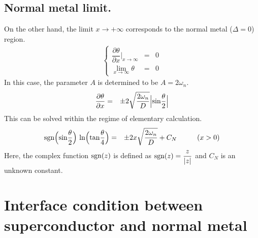 \documentclass[uplatex,a4j,12pt,dvipdfmx]{jsarticle}
\begin{document}
\subsection{Normal metal limit.}

On the other hand,
the limit $x \to + \infty$ corresponds to
the normal metal ($\Delta=0$) region.
\begin{eqnarray}
	\left\{
	\begin{array}{rcl}
		\dfrac{\partial \theta}{\partial x} \Big|_{x \to \infty}
		 & = & 0
		\\[4mm]
		\displaystyle \lim_{x \to \infty} \theta
		 & = &
		0
	\end{array}
	\right.
\end{eqnarray}
In this case, the parameter $A$ is determined to be $A=2 \omega_{n}$.
\begin{eqnarray}
	\dfrac{\partial \theta}{\partial x}
	&=&
	\pm
	2 \sqrt{ \dfrac{2 \omega_{n}}{D} } \Big| {\rm sin} \dfrac{\theta}{2} \Big|
\end{eqnarray}
This can be solved within the regime of elementary calculation.
\begin{eqnarray}
	{\rm sgn} \Big( {\rm sin} \dfrac{\theta}{2} \Big)
	\
	{\rm ln} \Big( {\rm tan} \dfrac{\theta}{4} \Big)
	&=&
	\pm
	2 x \sqrt{ \dfrac{2 \omega_{n}}{D} }
	+
	C_{N}
	\hspace{10mm}
	(x>0)
\end{eqnarray}
Here, the complex function ${\rm sgn}(z)$ is defined as ${\rm sgn}(z) = \dfrac{z}{|z|}$
and $C_{N}$ is an unknown constant.
\section{Interface condition between superconductor and normal metal}
\end{document}
